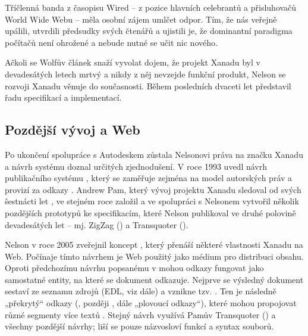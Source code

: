 \begin{quoted}{\autocite{trollout}}
Tříčlenná banda z časopisu Wired -- z pozice hlavních celebrantů a přisluhovačů World Wide Webu -- měla osobní zájem umlčet odpor. Tím, že nás veřejně upálili, utvrdili předsudky svých čtenářů a ujistili je, že dominantní paradigma počítačů není ohrožené a nebude nutné se učit nic nového.
\end{quoted}

Ačkoli se Wolfův článek snaží vyvolat dojem, že projekt Xanadu byl v devadesátých letech mrtvý a nikdy z něj nevzejde funkční produkt, Nelson se rozvoji Xanadu věnuje do současnosti. Během posledních dvaceti let představil řadu specifikací a implementací.

\subsection{Pozdější vývoj a Web}

Po ukončení spolupráce s Autodeskem zůstala Nelsonovi práva na značku Xanadu a návrh systému doznal určitých zjednodušení. V roce 1993 uvedl návrh publikačního systému , který se zaměřuje zejména na model autorských práv a provizí za odkazy \autocites{XanaLight}[4]{XanaFAQ}. Andrew Pam, který vývoj projektu Xanadu sledoval od svých šestnácti let \autocite{intertw:Pam}, ve stejném roce založil  a ve spolupráci s Nelsonem vytvořil několik pozdějších prototypů ke specifikacím, které Nelson publikoval ve druhé polovině devadesátých let -- mj. ZigZag () a Transquoter ().

\label{p:xana:flinks}
Nelson v roce 2005 zveřejnil koncept , který přenáší některé vlastnosti Xanadu na Web.
Počínaje tímto návrhem je Web použitý jako médium pro distribuci obsahu. Oproti předchozímu návrhu popsanému v  mohou odkazy fungovat jako samostatné entity, na které se dokument odkazuje. Nejprve se výsledný dokument sestaví ze seznamu zdrojů (EDL, viz dále) a vznikne tzv. . Ten je následně „překrytý“ odkazy (, později , dále „plovoucí odkazy“), které mohou propojovat různé segmenty více textů \autocites{xanasimp}{Translit}. Stejný návrh využívá Pamův Transquoter () a všechny pozdější návrhy; liší se pouze názvosloví funkcí a syntax souborů.

